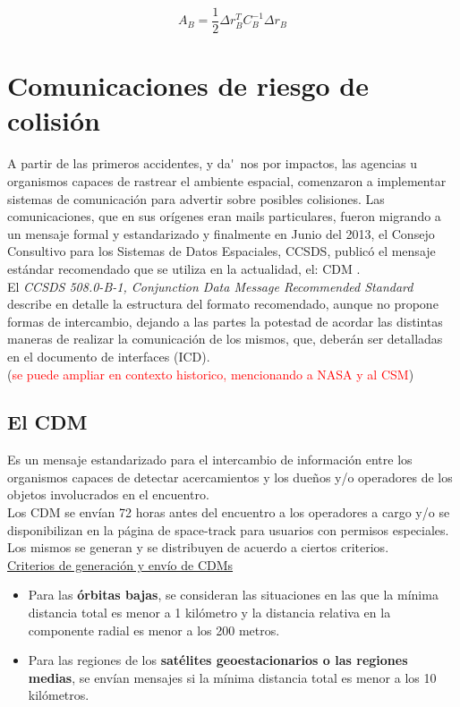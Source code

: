 \begin{equation}
A_{B}=\frac{1}{2}\Delta r^{T}_{B} C^{-1}_{B} \Delta r_{B}
\end{equation}



\section{Comunicaciones de riesgo de colisi\'on}{\label{sec:anuncio}}


A partir de las primeros accidentes, y da\'~nos por impactos, las agencias u organismos capaces de rastrear el ambiente espacial, comenzaron a implementar sistemas de comunicaci\'on para advertir sobre posibles colisiones. Las comunicaciones, que en sus or\'igenes eran mails particulares, fueron migrando a un mensaje formal y estandarizado y finalmente en Junio del 2013, el Consejo Consultivo para los Sistemas de Datos Espaciales, \ac{CCSDS}, public\'o el mensaje est\'andar recomendado que se utiliza en la actualidad, el: \ac{CDM} \citep{CDMstd}.\\
El {\it{CCSDS 508.0-B-1, Conjunction Data Message Recommended Standard}} describe en detalle la estructura del formato recomendado, aunque no propone formas de intercambio, dejando a las partes la potestad de acordar las distintas maneras de realizar la comunicaci\'on de los mismos, que, deber\'an ser detalladas en el documento de interfaces (ICD).\\

(\textcolor{red}{se puede ampliar en contexto historico, mencionando a NASA y al CSM})\\

\subsection{El CDM}\label{subsec:cdm}

Es un mensaje estandarizado para el intercambio de informaci\'on entre los organismos capaces de detectar acercamientos y los due\~nos y/o operadores de los objetos involucrados en el encuentro.\\
Los CDM se env\'ian 72 horas antes del encuentro a los operadores a cargo y/o se disponibilizan en la p\'agina de space-track para usuarios con permisos especiales.\\
Los mismos se generan y se distribuyen de acuerdo a ciertos criterios.\\


\underline{Criterios de generaci\'on y env\'io de CDMs}
\begin{itemize}
\item Para las {\bf{\'orbitas bajas}}, se consideran las situaciones en las que la m\'inima distancia total es menor a 1 kil\'ometro y la distancia relativa en la componente radial es menor a los 200 metros.\\

\item Para las regiones de los {\bf{sat\'elites geoestacionarios o las regiones medias}}, se env\'ian mensajes si la m\'inima distancia total es menor a los 10 kil\'ometros.\\
\end{itemize}


